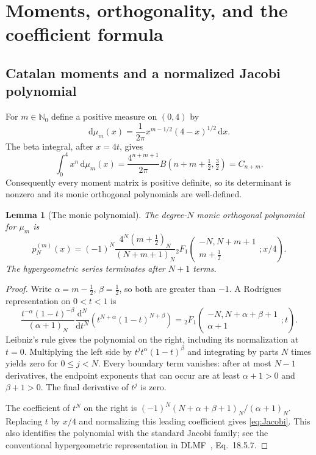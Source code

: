 \documentclass[11pt,a4paper]{article}
\numberwithin{equation}{section}
\newtheorem{lemma}[theorem]{Lemma}
\theoremstyle{definition}
\theoremstyle{remark}
\newcommand{\NN}{\mathbb N_0}
\newcommand{\dd}{\mathrm d}
\newcommand{\hyp}[4]{{}_2F_1\!\left(\begin{matrix}#1,#2\\#3\end{matrix};#4\right)}
\begin{document}
\section{Moments, orthogonality, and the coefficient formula}\label{sec:coeffproof}

\subsection{Catalan moments and a normalized Jacobi polynomial}
For $m\in\NN$ define a positive measure on $(0,4)$ by
\begin{equation}\label{eq:measure}
 \dd\mu_m(x)=\frac1{2\pi}x^{m-1/2}(4-x)^{1/2}\,\dd x.
\end{equation}
The beta integral, after $x=4t$, gives
\begin{equation}\label{eq:moments}
 \int_0^4 x^n\,\dd\mu_m(x)
 =\frac{4^{n+m+1}}{2\pi}B(n+m+\tfrac12,\tfrac32)
 =C_{n+m}.
\end{equation}
Consequently every moment matrix is positive definite, so its determinant
is nonzero and its monic orthogonal polynomials are well-defined.

\begin{lemma}[The monic polynomial]\label{lem:Jacobi}
The degree-$N$ monic orthogonal polynomial for $\mu_m$ is
\begin{equation}\label{eq:Jacobi}
 p_N^{(m)}(x)=(-1)^N
 \frac{4^N(m+\tfrac12)_N}{(N+m+1)_N}
 \hyp{-N}{N+m+1}{m+\tfrac12}{x/4}.
\end{equation}
The hypergeometric series terminates after $N+1$ terms.
\end{lemma}
\begin{proof}
Write $\alpha=m-\tfrac12$, $\beta=\tfrac12$, so both are greater than $-1$.
A Rodrigues representation on $0<t<1$ is
\begin{equation}\label{eq:Rodrigues}
 \frac{t^{-\alpha}(1-t)^{-\beta}}{(\alpha+1)_N}
 \frac{\dd^N}{\dd t^N}
       \left(t^{N+\alpha}(1-t)^{N+\beta}\right)
 =\hyp{-N}{N+\alpha+\beta+1}{\alpha+1}{t}.
\end{equation}
Leibniz's rule gives the polynomial on the right, including its
normalization at $t=0$.  Multiplying the left side by
$t^j t^\alpha(1-t)^\beta$ and integrating by parts $N$ times yields
zero for $0\leq j<N$.  Every boundary term vanishes: after at most
$N-1$ derivatives, the endpoint exponents that can occur are at least
$\alpha+1>0$ and $\beta+1>0$.  The final derivative of $t^j$ is zero.

The coefficient of $t^N$ on the right is
$(-1)^N(N+\alpha+\beta+1)_N/(\alpha+1)_N$.
Replacing $t$ by $x/4$ and normalizing this leading coefficient gives
\eqref{eq:Jacobi}.  This also identifies the polynomial with the standard
Jacobi family; see the conventional hypergeometric representation in
DLMF~\cite{DLMF}, Eq.~18.5.7.
\end{proof}
\end{document}
